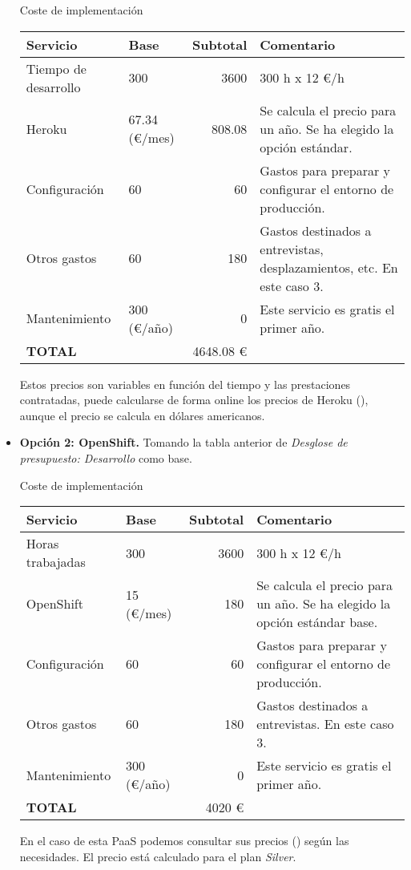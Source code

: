 \begin{itemize}
\newpage

\begin{center}
    \begin{large}
        Coste de implementación \\
    \end{large}
    \begin{tabular}{| l | l | r | p{5cm} |}
        \hline
        Servicio & Base & Subtotal & Comentario \\ \hline
        Tiempo de desarrollo & 300 & 3600 & 300 h x 12 \euro/h \\ \hline
        Heroku & 67.34 (\euro/mes) & 808.08 & Se calcula el precio para un año. Se ha elegido la opción estándar.\\ \hline
        Configuración & 60 & 60 & Gastos para preparar y configurar el entorno de producción. \\ \hline 
        Otros gastos & 60 & 180 & Gastos destinados a entrevistas, desplazamientos, etc. En este caso 3. \\ \hline 
        Mantenimiento & 300 (\euro/año) & 0 & Este servicio es gratis el primer año. \\ \hline
        \textbf{TOTAL} &  & 4648.08 \euro &  \\ \hline
    \end{tabular}
\end{center}

Estos precios son variables en función del tiempo y las prestaciones contratadas, puede calcularse de forma online los precios de Heroku (\cite{URL:Heroku_Pircing}), aunque el precio se calcula en dólares americanos. 

\item \textbf{Opción 2: OpenShift.} Tomando la tabla anterior de \emph{Desglose de presupuesto: Desarrollo} como base.
\begin{center}
    \begin{large}
        Coste de implementación \\
    \end{large}
    \begin{tabular}{| l | l | r | p{5cm} |}
    \hline
    Servicio & Base & Subtotal & Comentario \\ \hline
    Horas trabajadas & 300 & 3600 & 300 h x 12 \euro/h \\ \hline
    OpenShift & 15 (\euro/mes) & 180 & Se calcula el precio para un año. Se ha elegido la opción estándar base.\\ \hline
    Configuración & 60 & 60 & Gastos para preparar y configurar el entorno de producción. \\ \hline 
    Otros gastos & 60 & 180 & Gastos destinados a entrevistas. En este caso 3. \\ \hline 
    Mantenimiento & 300 (\euro/año) & 0 & Este servicio es gratis el primer año. \\ \hline
    \textbf{TOTAL} &  & 4020 \euro & \\ \hline
    \end{tabular}
\end{center}

En el caso de esta PaaS podemos consultar sus precios (\cite{URL:Openshift_Pircing}) según las necesidades. El precio está calculado para el plan \emph{Silver}.

\end{itemize}
